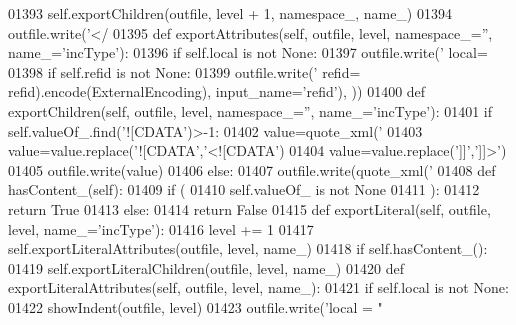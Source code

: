 \begin{DoxyCode}
{{{{{{{{{{{{{{{{{{{{{{{{{{{{{{{{{{{{{{{{{{{{{{{{{{{{{{{{{{{{{{{{{{{{{{{{{{{{{{{{01393         self.exportChildren(outfile, level + 1, namespace\_, name\_)
01394         outfile.write(\textcolor{stringliteral}{'</%
01395     \textcolor{keyword}{def }exportAttributes(self, outfile, level, namespace\_='', name\_='incType'):
01396         \textcolor{keywordflow}{if} self.local \textcolor{keywordflow}{is} \textcolor{keywordflow}{not} \textcolor{keywordtype}{None}:
01397             outfile.write(\textcolor{stringliteral}{' local=%
01398         \textcolor{keywordflow}{if} self.refid \textcolor{keywordflow}{is} \textcolor{keywordflow}{not} \textcolor{keywordtype}{None}:
01399             outfile.write(\textcolor{stringliteral}{' refid=%
      refid).encode(ExternalEncoding), input\_name=\textcolor{stringliteral}{'refid'}), ))
01400     \textcolor{keyword}{def }exportChildren(self, outfile, level, namespace\_='', name\_='incType'):
01401         \textcolor{keywordflow}{if} self.valueOf\_.find(\textcolor{stringliteral}{'![CDATA'})>-1:
01402             value=quote_xml(\textcolor{stringliteral}{'%
01403             value=value.replace(\textcolor{stringliteral}{'![CDATA'},\textcolor{stringliteral}{'<![CDATA'})
01404             value=value.replace(\textcolor{stringliteral}{']]'},\textcolor{stringliteral}{']]>'})
01405             outfile.write(value)
01406         \textcolor{keywordflow}{else}:
01407             outfile.write(quote_xml(\textcolor{stringliteral}{'%
01408     \textcolor{keyword}{def }hasContent_(self):
01409         \textcolor{keywordflow}{if} (
01410             self.valueOf_ \textcolor{keywordflow}{is} \textcolor{keywordflow}{not} \textcolor{keywordtype}{None}
01411             ):
01412             \textcolor{keywordflow}{return} \textcolor{keyword}{True}
01413         \textcolor{keywordflow}{else}:
01414             \textcolor{keywordflow}{return} \textcolor{keyword}{False}
01415     \textcolor{keyword}{def }exportLiteral(self, outfile, level, name\_='incType'):
01416         level += 1
01417         self.exportLiteralAttributes(outfile, level, name\_)
01418         \textcolor{keywordflow}{if} self.hasContent_():
01419             self.exportLiteralChildren(outfile, level, name\_)
01420     \textcolor{keyword}{def }exportLiteralAttributes(self, outfile, level, name\_):
01421         \textcolor{keywordflow}{if} self.local \textcolor{keywordflow}{is} \textcolor{keywordflow}{not} \textcolor{keywordtype}{None}:
01422             showIndent(outfile, level)
01423             outfile.write(\textcolor{stringliteral}{'local = "%
}}}}}}}}}}}}}}}}}}}}}}}}}}}}}}}}}}}}}}}}}}}}}}}}}}}}}}}}}}}}}}}}}}}}}}}}}}}}}}}}}}}}}}
\end{DoxyCode}
